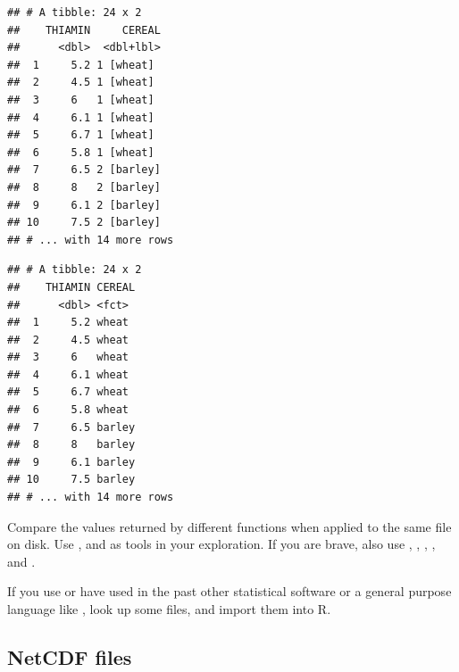 \documentclass[krantz2]{krantz}\usepackage{knitr}%
\begin{document}
\begin{knitrout}\footnotesize
{}\color{fgcolor}\begin{kframe}
\begin{alltt}
 \hlkwb{<-} \hlstd{(} \hlstd{=} \hlstd{)}
\end{alltt}
\begin{verbatim}
## # A tibble: 24 x 2
##    THIAMIN     CEREAL
##      <dbl>  <dbl+lbl>
##  1     5.2 1 [wheat] 
##  2     4.5 1 [wheat] 
##  3     6   1 [wheat] 
##  4     6.1 1 [wheat] 
##  5     6.7 1 [wheat] 
##  6     5.8 1 [wheat] 
##  7     6.5 2 [barley]
##  8     8   2 [barley]
##  9     6.1 2 [barley]
## 10     7.5 2 [barley]
## # ... with 14 more rows
\end{verbatim}
\begin{alltt}
 \hlkwb{<-} 
\end{alltt}
\begin{verbatim}
## # A tibble: 24 x 2
##    THIAMIN CEREAL
##      <dbl> <fct> 
##  1     5.2 wheat 
##  2     4.5 wheat 
##  3     6   wheat 
##  4     6.1 wheat 
##  5     6.7 wheat 
##  6     5.8 wheat 
##  7     6.5 barley
##  8     8   barley
##  9     6.1 barley
## 10     7.5 barley
## # ... with 14 more rows
\end{verbatim}
\end{kframe}
\end{knitrout}

\begin{playground}
Compare the values returned by different  functions when applied to the same file on disk. Use ,  and  as tools in your exploration. If you are brave, also use , , , ,  and .
\end{playground}

\begin{playground}
If you use or have used in the past other statistical software or a general purpose language like , look up some files, and import them into R.
\end{playground}

\subsection{NetCDF files}
\end{document}
